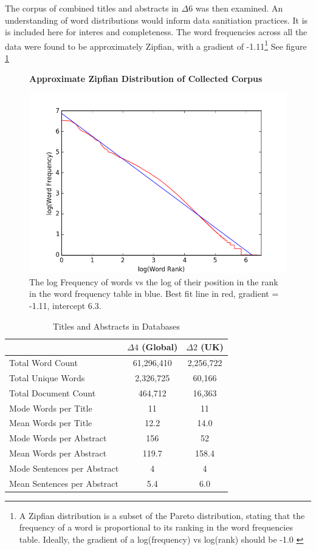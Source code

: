 The corpus of combined titles and abstracts in $\Delta6$ was then examined. An understanding of word distributions would inform data sanitiation practices. It is is included here for interes and completeness. The word frequencies across all the data were found to be approximately Zipfian, with a gradient of -1.11\footnote{A Zipfian distribution is a subset of the Pareto distribution, stating that the frequency of a word is proportional to its ranking in the word frequencies table. Ideally, the gradient of a log(frequency) vs log(rank) should be -1.0 \cite{zipf}} See figure \ref{fig:ZIPF}
\begin{figure}[H]
    \centering
    \textbf{Approximate Zipfian Distribution of Collected Corpus}\par\medskip
    \includegraphics[scale=0.5]{Data_Acquisition/zipf.png}
    \caption[Zipfian Plot of Collected Corpus]{The log Frequency of words vs the log of their position in the rank in the word frequency table in blue. Best fit line in red, gradient = -1.11, intercept 6.3. }
     \label{fig:ZIPF}
\end{figure}
\newpage
\begin{table}[h!]
\caption{Titles and Abstracts in Databases}
\label{tab:CORPUS STATS}
\begin{center}
\begin{tabular}{||l|c|c||}
\hline
&$\Delta4$ (Global)& $\Delta2$ (UK)\\
\hline
Total Word Count & 61,296,410 & 2,256,722 \\
Total Unique Words & 2,326,725 & 60,166\\
Total Document Count & 464,712 & 16,363\\
Mode Words per Title &  11 & 11\\
Mean Words per Title &  12.2 & 14.0\\
Mode Words per Abstract & 156 & 52\\
Mean Words per Abstract & 119.7 & 158.4\\
Mode Sentences per Abstract & 4 & 4\\
Mean Sentences per Abstract & 5.4 & 6.0\\
\hline
\end{tabular}
\end{center}
\end{table}

